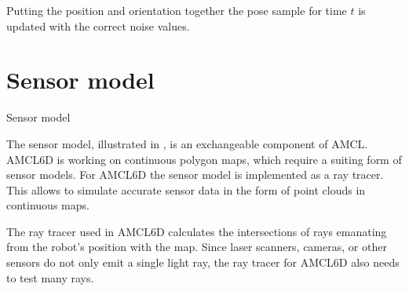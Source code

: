 \documentclass[Thesis.tex]{subfiles}
\begin{document}
Putting the position and orientation together the pose sample for time $t$ is updated with the correct noise values.
%
%
%
%
%
%
\section{Sensor model}\label{sec:sensormodel}
%
\begin{algorithm}[!htp]
\caption{Sensor model}
\label{alg:sensormodel}

\end{algorithm}
%
The sensor model, illustrated in , is an exchangeable component of \gls{AMCL}. \gls{AMCL6D} is working on continuous polygon maps, which require a suiting form of sensor models. For \gls{AMCL6D} the sensor model is implemented as a ray tracer. This allows to simulate accurate sensor data in the form of point clouds in continuous maps. 

\label{sec:raytrace}
The ray tracer used in \gls{AMCL6D} calculates the intersections of rays emanating from the robot's position with the map. Since laser scanners, cameras, or other sensors do not only emit a single light ray, the ray tracer for \gls{AMCL6D} also needs to test many rays. 
\end{document}
